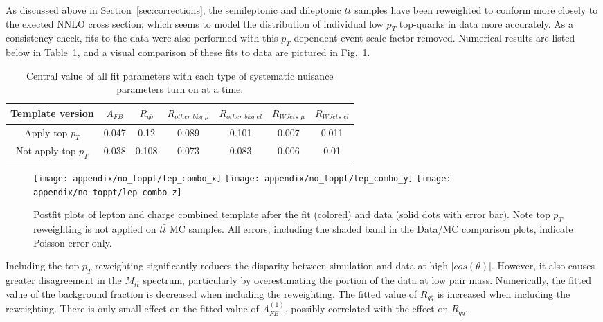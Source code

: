 \documentclass{cmspaperpdf}
\begin{document}
As discussed above in Section~\ref{sec:corrections}, the semileptonic and dileptonic $t\bar{t}$ samples have been reweighted to conform more closely to the exected NNLO cross section, which seems to model the distribution of individual low $p_{T}$ top-quarks in data more accurately. As a consistency check, fits to the data were also performed with this $p_{T}$ dependent event scale factor removed. Numerical results are listed below in Table~\ref{appendix:top-pt}, and a visual comparison of these fits to data are pictured in Fig.~\ref{appendix: top pt postfit}.

\begin{table}[htb]
\centering
\begin{tabular}{c|cc|cccc}
Template version & $A_{FB}$ &   $R_{q\bar{q}}$ & $R_{other\_bkg\_\mu}$ & $R_{other\_bkg\_el}$ & $R_{WJets\_\mu}$ & $R_{WJets\_el}$ \\
\hline
Apply top $p_T$         &  0.047 &   0.12 &          0.089 &          0.101 &      0.007 &      0.011 \\
Not apply   top $p_T$   &  0.038 &  0.108 &          0.073 &          0.083 &      0.006 &       0.01 \\
\hline
\end{tabular}
\caption{Central value of all fit parameters with each type of systematic nuisance parameters turn on at a time.}
\label{appendix:top-pt}
\end{table}


\begin{figure}[hbt]
  \begin{center}
    \texttt{[image: appendix/no\_toppt/lep\_combo\_x]}
    \texttt{[image: appendix/no\_toppt/lep\_combo\_y]}
    \texttt{[image: appendix/no\_toppt/lep\_combo\_z]}
  \caption{\small Postfit plots of lepton and charge combined template after the fit (colored) and data (solid dots with error bar). Note top $p_T$ reweighting is not applied on $t\bar{t}$ MC samples. All errors, including the shaded band in the Data/MC comparison plots, indicate Poisson error only.}
    \label{appendix: top pt postfit}
  \end{center}
\end{figure}



Including the top $p_{T}$ reweighting significantly reduces the disparity between simulation and data at high $|cos(\theta)|$. However, it also causes greater disagreement in the $M_{t\bar{t}}$ spectrum, particularly by overestimating the portion of the data at low pair mass. Numerically, the fitted value of the background fraction is decreased when including the reweighting. The fitted value of $R_{q\bar q}$ is increased when including the reweighting. There is only small effect on the fitted value of $A^{(1)}_{FB}$, possibly correlated with the effect on $R_{q\bar q}$.
\end{document}
